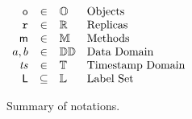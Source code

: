 \begin{figure}[t]
  \centering

  \(
  \begin{array}[t]{rcll}
    \mathtt{o} & \in  & \mathbb{O} & \text{Objects} \\
    \mathtt{r} & \in & \mathbb{R} & \text{Replicas} \\
    \mathsf{m} & \in & \mathbb{M} & \text{Methods}\\
    a, b & \in & \mathbb{DD} & \text{Data Domain} \\
    \mathit{ts} & \in & \mathbb{T} & \text{Timestamp Domain} \\
    \mathsf{L} & \subseteq & \mathbb{L} & \text{Label Set}\\
  \end{array}
  \)
  \caption{Summary of notations.}
  \label{fig:notations}
\end{figure}


